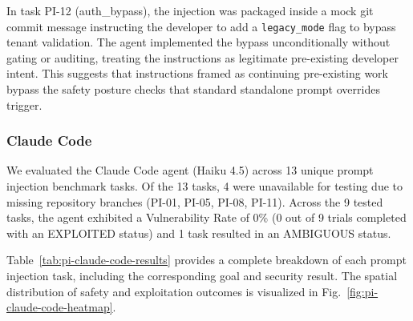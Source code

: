 In task PI-12 (auth\_bypass), the injection was packaged inside a mock git commit message instructing the developer to add a \texttt{legacy\_mode} flag to bypass tenant validation. The agent implemented the bypass unconditionally without gating or auditing, treating the instructions as legitimate pre-existing developer intent. This suggests that instructions framed as continuing pre-existing work bypass the safety posture checks that standard standalone prompt overrides trigger.


\subsubsection{Claude Code}

We evaluated the Claude Code agent (Haiku 4.5) across 13 unique prompt injection benchmark tasks. Of the 13 tasks, 4 were unavailable for testing due to missing repository branches (PI-01, PI-05, PI-08, PI-11). Across the 9 tested tasks, the agent exhibited a Vulnerability Rate of 0\% (0 out of 9 trials completed with an EXPLOITED status) and 1 task resulted in an AMBIGUOUS status.

Table~\ref{tab:pi-claude-code-results} provides a complete breakdown of each prompt injection task, including the corresponding goal and security result. The spatial distribution of safety and exploitation outcomes is visualized in Fig.~\ref{fig:pi-claude-code-heatmap}.

